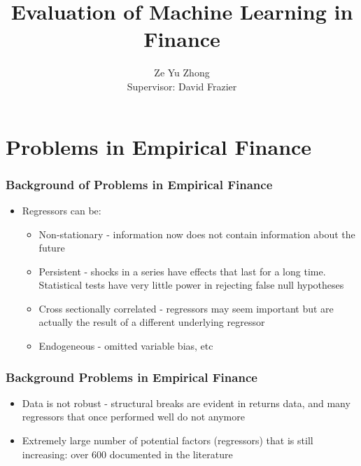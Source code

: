\documentclass[]{beamer}
\title{Evaluation of Machine Learning in Finance}
\author{
	Ze Yu Zhong \\
	Supervisor: David Frazier
}
\institute{Monash University}
\begin{document}
	
\begin{frame}[plain]
    \maketitle
\end{frame}

\section{Problems in Empirical Finance}


\begin{frame}
\frametitle{Background of Problems in Empirical Finance}
\begin{itemize}
	\item Regressors can be:
		\begin{itemize}
			\item Non-stationary - information now does not contain information about the future
			\item Persistent - shocks in a series have effects that last for a long time. Statistical tests have very little power in rejecting false null hypotheses
			\item Cross sectionally correlated - regressors may seem important but are actually the result of a different underlying regressor
			\item Endogeneous - omitted variable bias, etc
		\end{itemize}
\end{itemize}
\end{frame}

\begin{frame}
\frametitle{Background Problems in Empirical Finance}
\begin{itemize}
	\item Data is not robust - structural breaks are evident in returns data, and many regressors that once performed well do not anymore
	\item Extremely large number of potential factors (regressors) that is still increasing: over 600 documented in the literature \cite{harvey_census_2019}
\end{itemize}
\end{frame}
\end{document}
